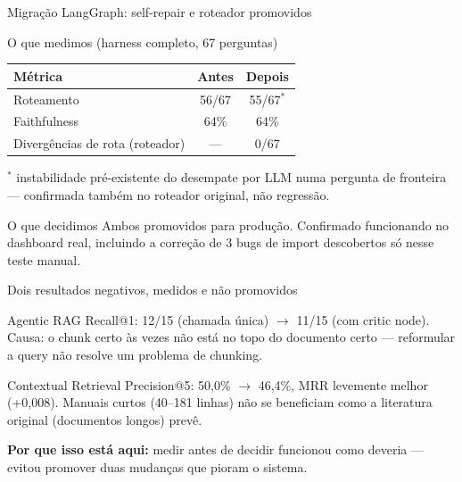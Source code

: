 \documentclass{beamer}
\newenvironment{numerobloco}[1]{\begin{block}{#1}}{\end{block}}
\newenvironment{decisaobloco}[1]{\begin{alertblock}{#1}}{\end{alertblock}}
\begin{document}
\begin{frame}{Migração LangGraph: self-repair e roteador promovidos}
  \small
  \begin{numerobloco}{O que medimos (harness completo, 67 perguntas)}
    \begin{center}
    \begin{tabular}{lcc}
      \toprule
      \textbf{Métrica} & \textbf{Antes} & \textbf{Depois} \\
      \midrule
      Roteamento     & 56/67 & 55/67$^*$ \\
      Faithfulness   & 64\%  & 64\%     \\
      Divergências de rota (roteador) & — & 0/67 \\
      \bottomrule
    \end{tabular}
    \end{center}
    \footnotesize $^*$ instabilidade pré-existente do desempate por LLM numa pergunta
    de fronteira — confirmada também no roteador original, não regressão.
  \end{numerobloco}

  \pause
  \begin{decisaobloco}{O que decidimos}
    Ambos promovidos para produção. Confirmado funcionando no dashboard real, incluindo
    a correção de 3 bugs de import descobertos só nesse teste manual.
  \end{decisaobloco}
\end{frame}

\begin{frame}{Dois resultados negativos, medidos e não promovidos}
  \begin{numerobloco}{Agentic RAG}
    Recall@1: 12/15 (chamada única) $\to$ \alert{11/15} (com critic node). Causa: o
    chunk certo às vezes não está no topo do documento certo — reformular a query não
    resolve um problema de chunking.
  \end{numerobloco}
  \begin{numerobloco}{Contextual Retrieval}
    Precision@5: 50,0\% $\to$ \alert{46,4\%}, MRR levemente melhor (+0,008). Manuais
    curtos (40--181 linhas) não se beneficiam como a literatura original (documentos
    longos) prevê.
  \end{numerobloco}

  \pause
  \textbf{Por que isso está aqui:} medir antes de decidir funcionou como deveria —
  evitou promover duas mudanças que pioram o sistema.
\end{frame}
\end{document}
